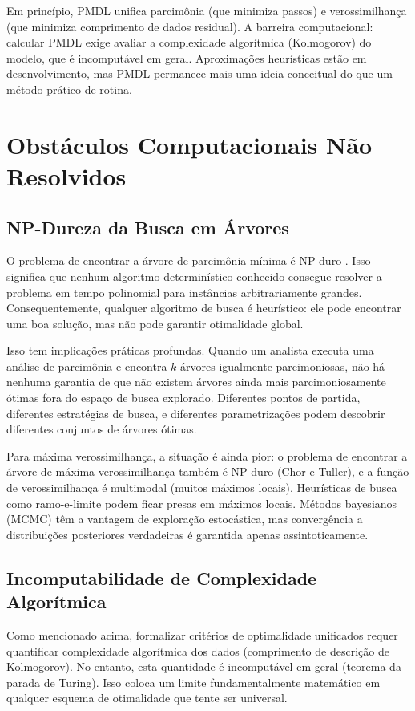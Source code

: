 Em princípio, PMDL unifica parcimônia (que minimiza passos) e verossimilhança (que minimiza comprimento de dados residual). A barreira computacional: calcular PMDL exige avaliar a complexidade algorítmica (Kolmogorov) do modelo, que é incomputável em geral. Aproximações heurísticas estão em desenvolvimento, mas PMDL permanece mais uma ideia conceitual do que um método prático de rotina.

\section{Obstáculos Computacionais Não Resolvidos}

\subsection{NP-Dureza da Busca em Árvores}

O problema de encontrar a árvore de parcimônia mínima é NP-duro \parencite{graur1991}. Isso significa que nenhum algoritmo determinístico conhecido consegue resolver a problema em tempo polinomial para instâncias arbitrariamente grandes. Consequentemente, qualquer algoritmo de busca é heurístico: ele pode encontrar uma boa solução, mas não pode garantir otimalidade global.

Isso tem implicações práticas profundas. Quando um analista executa uma análise de parcimônia e encontra $k$ árvores igualmente parcimoniosas, não há nenhuma garantia de que não existem árvores ainda mais parcimoniosamente ótimas fora do espaço de busca explorado. Diferentes pontos de partida, diferentes estratégias de busca, e diferentes parametrizações podem descobrir diferentes conjuntos de árvores ótimas.

Para máxima verossimilhança, a situação é ainda pior: o problema de encontrar a árvore de máxima verossimilhança também é NP-duro (Chor e Tuller), e a função de verossimilhança é multimodal (muitos máximos locais). Heurísticas de busca como ramo-e-limite podem ficar presas em máximos locais. Métodos bayesianos (MCMC) têm a vantagem de exploração estocástica, mas convergência a distribuições posteriores verdadeiras é garantida apenas assintoticamente.

\subsection{Incomputabilidade de Complexidade Algorítmica}

Como mencionado acima, formalizar critérios de optimalidade unificados requer quantificar complexidade algorítmica dos dados (comprimento de descrição de Kolmogorov). No entanto, esta quantidade é incomputável em geral (teorema da parada de Turing). Isso coloca um limite fundamentalmente matemático em qualquer esquema de otimalidade que tente ser universal.

